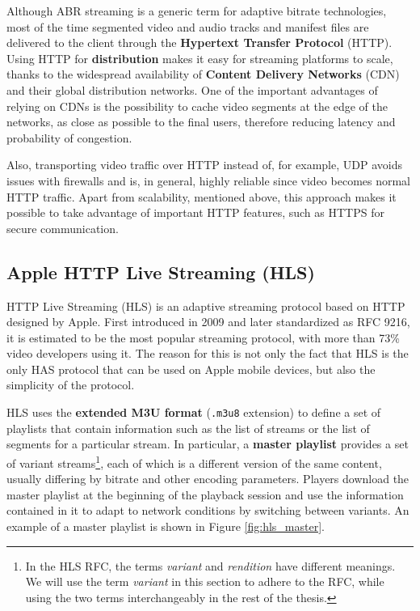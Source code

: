 Although ABR streaming is a generic term for adaptive bitrate technologies, most of the time segmented video and audio tracks and manifest files are delivered to the client through the \textbf{Hypertext Transfer Protocol} (HTTP). Using HTTP for \textbf{distribution} makes it easy for streaming platforms to scale, thanks to the widespread availability of \textbf{Content Delivery Networks} (CDN) and their global distribution networks. One of the important advantages of relying on CDNs is the possibility to cache video segments at the edge of the networks, as close as possible to the final users, therefore reducing latency and probability of congestion.

Also, transporting video traffic over HTTP instead of, for example, UDP avoids issues with firewalls and is, in general, highly reliable since video becomes normal HTTP traffic. Apart from scalability, mentioned above, this approach makes it possible to take advantage of important HTTP features, such as HTTPS for secure communication.

\subsection{Apple HTTP Live Streaming (HLS)}
\label{sec:bg/abr/hls}

HTTP Live Streaming (HLS) is an adaptive streaming protocol based on HTTP designed by Apple. First introduced in 2009 and later standardized as RFC 9216, it is estimated to be the most popular streaming protocol, with more than 73\% video developers using it.\cite{rfc8216}\cite{bitmovin} The reason for this is not only the fact that HLS is the only HAS protocol that can be used on Apple mobile devices, but also the simplicity of the protocol.

HLS uses the \textbf{extended M3U format} (\texttt{.m3u8} extension) to define a set of playlists that contain information such as the list of streams or the list of segments for a particular stream. In particular, a \textbf{master playlist} provides a set of variant streams\footnote{In the HLS RFC, the terms \textit{variant} and \textit{rendition} have different meanings. We will use the term \textit{variant} in this section to adhere to the RFC, while using the two terms interchangeably in the rest of the thesis.}, each of which is a different version of the same content, usually differing by bitrate and other encoding parameters. Players download the master playlist at the beginning of the playback session and use the information contained in it to adapt to network conditions by switching between variants. An example of a master playlist is shown in Figure \ref{fig:hls_master}.

